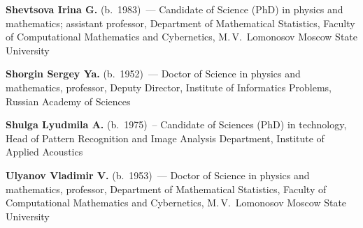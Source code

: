 \begin{multicols}{2}
\noindent
\textbf{Shevtsova Irina G.} (b.\ 1983)~--- Candidate of Science (PhD) in physics and mathematics; 
assistant professor, Department of Mathematical Statistics, 
Faculty of Computational Mathematics and Cybernetics, M.\,V.~Lomonosov 
Moscow State University

\vspace*{3pt}

\noindent
\textbf{Shorgin Sergey Ya.} (b.\ 1952)~--- Doctor of Science in physics and 
mathematics, professor, Deputy Director, Institute of Informatics Problems, 
Russian Academy of Sciences

\vspace*{3pt}

\noindent
\textbf{Shulga Lyudmila A.} (b.\ 1975)~--  Candidate of Sciences (PhD) in 
technology, Head of Pattern Recognition and Image Analysis Department, 
Institute of Applied Acoustics



\vspace*{3pt}

\noindent
\textbf{Ulyanov Vladimir V.} (b.\ 1953)~--- Doctor of Science in physics 
and mathematics, professor, Department of Mathematical Statistics, Faculty 
of Computational Mathematics and Cybernetics, M.\,V.~Lomonosov Moscow State University



\thispagestyle{empty}

\end{multicols}